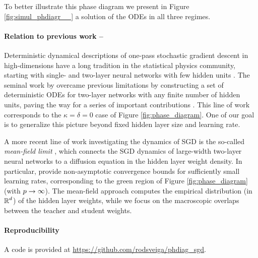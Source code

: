 \documentclass[10pt]{article}
\begin{document}
To better illustrate this phase diagram we present in Figure \ref{fig:simul_phdiagr__} a solution of the ODEs in all three regimes.



\paragraph{Relation to previous work --} 
Deterministic dynamical descriptions of one-pass stochastic gradient descent in high-dimensions have a long tradition in the statistical physics community, starting with single- and two-layer neural networks with few hidden units \cite{kinzel_1990,kinouchi_1992, copelli_1995, biehl_1995, riegler_1995}. The seminal work by \cite{saad_1995} overcame previous limitations by constructing a set of deterministic ODEs for two-layer networks with any finite number of hidden units, paving the way for a series of important contributions \cite{saad_1996, vicente_1998,saad_1999, goldt_2019}. This line of work corresponds to the $\kappa = \delta = 0$ case of Figure \ref{fig:phase_diagram}. One of our goal is to generalize this picture beyond fixed hidden layer size and learning rate.

A more recent line of work investigating the dynamics of SGD is the so-called \emph{mean-field limit} \cite{mei_2018,mei_2019, chizat_2018,rotskoff_2019,sirignano2020mean}, which connects the SGD dynamics of large-width two-layer neural networks to a diffusion equation in the hidden layer weight density. In particular, \cite{mei_2019} provide non-asymptotic convergence bounds for sufficiently small learning rates, corresponding to the green region of Figure \ref{fig:phase_diagram} (with $ p \to \infty$). The mean-field approach computes the empirical distribution (in $\operatorname{\mathbb{R}}^d$) of the hidden layer weights, while we focus on the macroscopic overlaps between the teacher and student weights.


\paragraph{Reproducibility} A code is provided at \href{https://github.com/rodsveiga/phdiag_sgd}{https://github.com/rodsveiga/phdiag\_sgd}.

\end{document}
